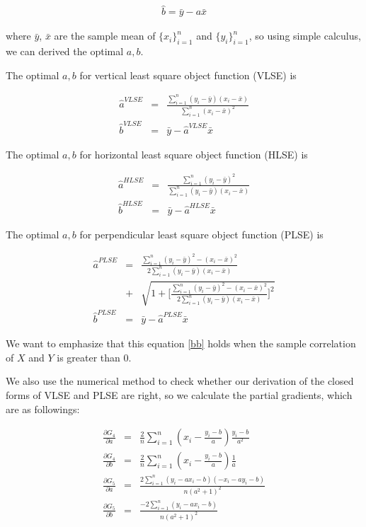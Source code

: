 \documentclass[twoside]{article}
\begin{document}
\begin{eqnarray}
\label{optb}
\hat{b} = \bar{y} - a \bar{x}
\end{eqnarray}

where $\bar{y}$, $\bar{x}$ are the sample mean of $\{x_i\}_{i=1}^n$ and $\{y_i\}_{i=1}^n$, so using simple calculus, we can derived the optimal $a, b$.

The optimal $a, b$ for vertical least square object function (VLSE) is

\begin{eqnarray}
  \hat{a}^{VLSE} &=& \frac{\sum_{i=1}^n{(y_i-\bar{y})(x_i-\bar{x})}}{\sum_{i=1}^n{(x_i-\bar{x})^2}} \\
  \hat{b}^{VLSE} &=& \bar{y} - \hat{a}^{VLSE} \bar{x}
\end{eqnarray}

The optimal $a, b$ for horizontal least square object function (HLSE) is

\begin{eqnarray}
  \hat{a}^{HLSE} &=& \frac{\sum_{i=1}^n{(y_i-\bar{y})^2}}{\sum_{i=1}^n{(y_i-\bar{y})(x_i-\bar{x})}} \\
  \hat{b}^{HLSE} &=& \bar{y} - \hat{a}^{HLSE} \bar{x}
\end{eqnarray}

The optimal $a, b$ for perpendicular least square object function (PLSE) is 

\begin{eqnarray}
  \hat{a}^{PLSE} &=& \frac{\sum_{i=1}^n{(y_i-\bar{y})^2}-(x_i-\bar{x})^2}{2\sum_{i=1}^n{(y_i-\bar{y})(x_i-\bar{x})}} \nonumber \\ &+& \sqrt{1+\big[\frac{\sum_{i=1}^n{(y_i-\bar{y})^2}-(x_i-\bar{x})^2}{2\sum_{i=1}^n{(y_i-\bar{y})(x_i-\bar{x})}}\big]^2} \label{bb} \\
  \hat{b}^{PLSE} &=& \bar{y} - \hat{a}^{PLSE} \bar{x}
\end{eqnarray}

We want to emphasize that this equation \ref{bb} holds when the sample correlation of $X$ and $Y$ is greater than 0.

We also use the numerical method to check whether our derivation of the closed forms of VLSE and PLSE are right, so we calculate the partial gradients, which are as followings:

\begin{eqnarray}
  \frac{\partial G_4}{\partial a}&=&\frac{2}{n}\sum_{i=1}^n{(x_i-\frac{y_i-b}{a})\frac{y_i-b}{a^2}} \\
  \frac{\partial G_4}{\partial b}&=&\frac{2}{n}\sum_{i=1}^n{(x_i-\frac{y_i-b}{a})\frac{1}{a}} \\
  \frac{\partial G_5}{\partial a}&=&\frac{2\sum_{i=1}^n{(y_i-a x_i-b)(-x_i-a y_i-b)}}{n(a^2+1)^2} \\
  \frac{\partial G_5}{\partial b}&=&\frac{-2\sum_{i=1}^n{(y_i-a x_i-b)}}{n(a^2+1)^2}
\end{eqnarray}
\end{document}
